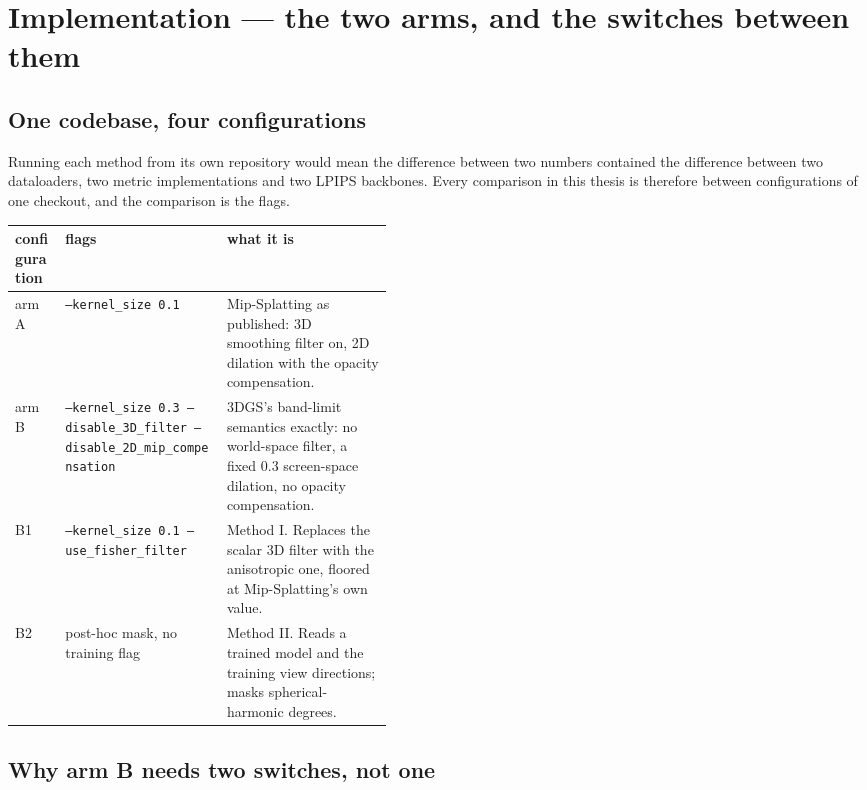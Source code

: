 \chapter{Implementation --- the two arms, and the switches between them}
\label{app:impl}


\section{One codebase, four configurations}

Running each method from its own repository would mean the difference between two
numbers contained the difference between two dataloaders, two metric
implementations and two LPIPS backbones. Every comparison in this thesis is
therefore between configurations of one checkout, and the comparison is the
flags.

\begin{center}\small
\begin{tabular}{llp{0.44\linewidth}}
  \toprule
  configuration & flags & what it is \\
  \midrule
  arm A & \texttt{--kernel\_size 0.1} &
    Mip-Splatting as published: 3D smoothing filter on, 2D dilation with the
    opacity compensation. \\
  arm B & \texttt{--kernel\_size 0.3 --disable\_3D\_filter
                  --disable\_2D\_mip\_compensation} &
    3DGS's band-limit semantics exactly: no world-space filter, a fixed $0.3$
    screen-space dilation, no opacity compensation. \\
  B1 & \texttt{--kernel\_size 0.1 --use\_fisher\_filter} &
    Method I. Replaces the scalar 3D filter with the anisotropic one, floored at
    Mip-Splatting's own value. \\
  B2 & post-hoc mask, no training flag &
    Method II. Reads a trained model and the training view directions; masks
    spherical-harmonic degrees. \\
  \bottomrule
\end{tabular}
\end{center}

\section{Why arm B needs two switches, not one}

